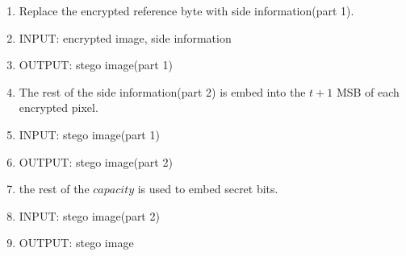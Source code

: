 \documentclass{article}
\begin{document}
\begin{enumerate}
	\item Replace the encrypted reference byte with side information(part 1).
	\item[] INPUT: encrypted image, side information
	\item[] OUTPUT: stego image(part 1)
	      
	\item The rest of the side information(part 2) is embed into the $t+1$ MSB of each encrypted pixel.
	\item[] INPUT: stego image(part 1)
	\item[] OUTPUT: stego image(part 2)
	      
	\item the rest of the $capacity$ is used to embed secret bits.
	\item[] INPUT: stego image(part 2)
	\item[] OUTPUT: stego image
\end{enumerate}
\end{document}
